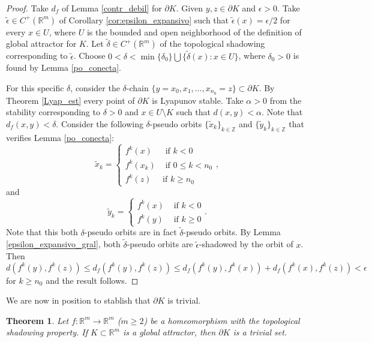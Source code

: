 \documentclass{amsart}
\newtheorem{teo}{Theorem}
\newcommand{\R}{{\mathbb{R}}}
\newcommand{\Z}{{\mathbb{Z}}}
\begin{document}
	\begin{proof}
		Take  $d_f$ of Lemma \ref{contr_debil} for $\partial K$.  Given $y, z\in\partial K$ and $\epsilon>0$.
		Take $\tilde{\epsilon}\in C^+(\R^m)$ of Corollary \ref{cor:epsilon_expansivo} such that $\tilde{\epsilon}(x)=\epsilon/2$ for every $x\in U$, where $U$ is the bounded and open   neighborhood of the definition of global  attractor for $K$.
		Let $\tilde{\delta}\in C^+(\R^m)$  of the topological shadowing  corresponding to $\tilde{\epsilon}$.
		Choose $0<\delta<\min\{\delta_0\}\bigcup \{\tilde{\delta}(x):x\in U\}$, where $\delta_0>0$ is found by Lemma \ref{po_conecta}.
		
		For this specific $\delta$, consider the $\delta$-chain 	 $\{y=x_0, x_1,\ldots, x_{n_0}=z\}\subset \partial K$. By Theorem \ref{Lyap_est} every point of $\partial K$ is Lyapunov stable. Take $\alpha>0$ from the stability corresponding to $\delta>0$ and $x\in U\setminus K$ such that $d(x,y)<\alpha$. Note that $d_f(x,y)<\delta$. 
		Consider the following $\delta$-pseudo orbits 	 $\{\tilde{x}_k\}_{k\in\Z}$ and $\{\tilde{y}_k\}_{k\in \Z}$ that verifies Lemma \ref{po_conecta}:
		$$\tilde{x}_k=\begin{cases} f^k(x)&\mbox{ if } k<0\\f^k(x_k)&\mbox{ if } 0\leq k<n_0\\ f^k(z)& \mbox{if } k\geq n_0\end{cases},$$ and  $$\tilde{y}_k=\begin{cases}  f^k(x)&\mbox{ if } k<0\\ f^k(y)& \mbox{ if }k\geq0\end{cases}.$$
		Note that this both $\delta$-pseudo orbits are in fact $\tilde{\delta}$-pseudo orbits.  By Lemma  \ref{epsilon_expansivo_gral}, both $\tilde{\delta}$-pseudo orbits are $\tilde{\epsilon}$-shadowed by the orbit of $x$.
		Then $$d(f^k(y), f^k(z))\leq d_f(f^k(y), f^k(z))\leq d_f(f^k(y), f^k(x))+d_f(f^k(x),f^k(z))<\epsilon$$ for $k\geq n_0$ and the result follows.
	\end{proof}	
	
	We are now in position to stablish that $\partial K$ is trivial. 
	
	\begin{teo}\label{borde_trivial}
		Let $f:\R^m\to \R^m$ ($m\geq 2$) be a homeomorphism with the topological shadowing property. 
		If $K\subset \R^m$ is a global attractor, then $\partial K$ is a trivial set.
	\end{teo}
	
\end{document}
